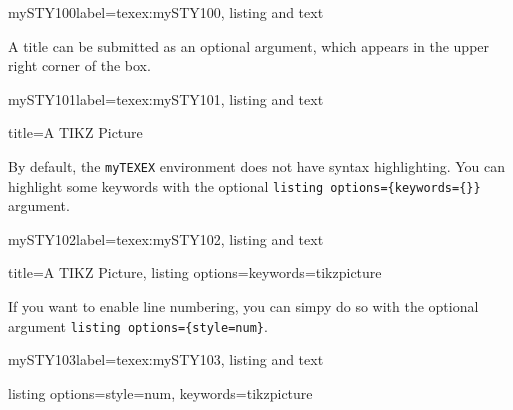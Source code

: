 \documentclass[]{myHOWTO-V001}
\begin{document}
\begin{myTEXEXdoclst}{mySTY100}{label={texex:mySTY100}, listing and text}
\begin{myTEXEX}{}
\begin{figure}[H]
\end{figure}
\end{myTEXEX}
\end{myTEXEXdoclst}

A title can be submitted as an optional argument, which appears in the upper right corner of the box.

\begin{myTEXEXdoclst}{mySTY101}{label={texex:mySTY101}, listing and text}
\begin{myTEXEX}{title={A TIKZ Picture}}
\begin{figure}[H]
	\begin{tikzpicture}
	[...]
	\end{tikzpicture}
\end{figure}
\end{myTEXEX}
\end{myTEXEXdoclst}

By default, the \Verb|myTEXEX| environment does not have syntax highlighting. You can highlight some keywords with the optional \verb|listing options={keywords={}}| argument.

\begin{myTEXEXdoclst}{mySTY102}{label={texex:mySTY102}, listing and text}
\begin{myTEXEX}{title={A TIKZ Picture}, listing options={keywords={tikzpicture}}}
\begin{figure}[H]
	\begin{tikzpicture}
	[...]
	\end{tikzpicture}
\end{figure}
\end{myTEXEX}
\end{myTEXEXdoclst}

If you want to enable line numbering, you can simpy do so with the optional argument \verb|listing options={style=num}|.

\begin{myTEXEXdoclst}{mySTY103}{label={texex:mySTY103}, listing and text}
\begin{myTEXEX}{listing options={style=num, keywords={tikzpicture}}}
\begin{figure}[H]
	\begin{tikzpicture}
	[...]
	\end{tikzpicture}
\end{figure}
\end{myTEXEX}
\end{myTEXEXdoclst}
\end{document}
